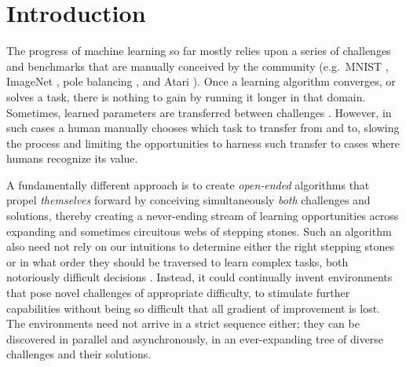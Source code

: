 \documentclass{article}
\newcommand{\removed}[1]{\comments{\textcolor{gray}{\sout{#1}}}}
\newcommand{\comments}[1]{#1} %
\begin{document}
\section{Introduction}
\label{introduction}

The progress of machine learning so far mostly relies upon a series of challenges and benchmarks that are manually conceived by the community (e.g.\ MNIST \cite{lecun1998gradient}, ImageNet \cite{deng2009imagenet}, pole balancing \cite{anderson1989learning}, and Atari \cite{bellemare2013arcade}). Once a learning algorithm converges, or solves a task, there is nothing to gain by 
running it longer in that domain. 
Sometimes, learned parameters are transferred between challenges \cite{yosinski2014transferable}. 
However, in such cases a human manually chooses which task to transfer from and to, slowing the process and limiting the opportunities to harness such transfer to cases where humans recognize its value. 
%

A fundamentally different approach is to create \emph{open-ended} algorithms \cite{standish2003open,langdon:metas05,bedau:alife08, taylor:alife16, stanley2017open,schmidhuber2013powerplay, forestier2017intrinsically} that propel \emph{themselves} forward by conceiving simultaneously \emph{both} challenges and solutions, 
thereby creating a never-ending stream of learning opportunities across expanding and sometimes circuitous webs of stepping stones. Such an algorithm also need not rely on our intuitions to determine either the right stepping stones or in what order they should be traversed to learn complex tasks, both notoriously difficult decisions \cite{stanley:book15}. Instead, it could continually invent environments that pose novel challenges of appropriate difficulty, to stimulate further capabilities without being so difficult that all gradient of improvement is lost. The environments need not arrive in a strict sequence either; they can be discovered in parallel and asynchronously, in an ever-expanding tree of diverse challenges and their solutions.
\end{document}

